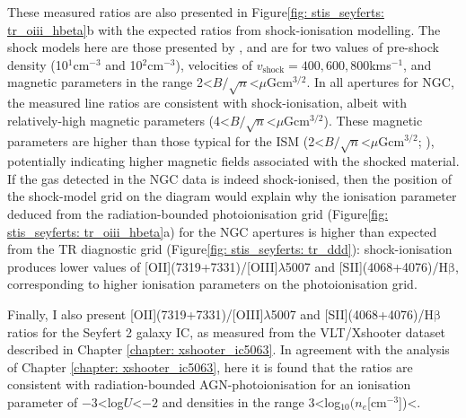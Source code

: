 These measured ratios are also presented in Figure\;\ref{fig: stis_seyferts: tr_oiii_hbeta}b with the expected ratios from shock-ionisation modelling. The shock models here are those presented by \citet{Allen2008}, and are for two values of pre-shock density (10$^1$\;cm$^{-3}$ and 10$^2$\;cm$^{-3}$), velocities of $v_\mathrm{shock}=400, 600, 800$\;km\;s$^{-1}$, and magnetic parameters in the range 2\;\textless\;$B/\sqrt{n}$\;\textless{}\;$\mu$G\;cm$^{3/2}$. In all apertures for NGC, the measured line ratios are consistent with shock-ionisation, albeit with relatively-high magnetic parameters (4\;\textless\;$B/\sqrt{n}$\;\textless{}\;$\mu$G\;cm$^{3/2}$). These magnetic parameters are higher than those typical for the ISM (2\;\textless\;$B/\sqrt{n}$\;\textless{}\;$\mu$G\;cm$^{3/2}$; \citealt{Dopita1995, Allen2008}), potentially indicating higher magnetic fields associated with the shocked material. If the gas detected in the NGC data is indeed shock-ionised, then the position of the shock-model grid on the diagram would explain why the ionisation parameter deduced from the radiation-bounded photoionisation grid (Figure\;\ref{fig: stis_seyferts: tr_oiii_hbeta}a) for the NGC apertures is higher than expected from the TR diagnostic grid (Figure\;\ref{fig: stis_seyferts: tr_ddd}): shock-ionisation produces lower values of [OII](7319+7331)/[OIII]$\lambda$5007 and [SII](4068+4076)/H$\mathrm{\beta}$, corresponding to higher ionisation parameters on the photoionisation grid.

Finally, I also present [OII](7319+7331)/[OIII]$\lambda$5007 and [SII](4068+4076)/H$\mathrm{\beta}$ ratios for the Seyfert 2 galaxy IC, as measured from the VLT/Xshooter dataset described in Chapter \ref{chapter: xshooter_ic5063}. In agreement with the analysis of Chapter \ref{chapter: xshooter_ic5063}, here it is found that the ratios are consistent with radiation-bounded AGN-photoionisation for an ionisation parameter of $-3$\;\textless\;log\;$U$\;\textless\;$-2$ and densities in the range 3\;\textless\;log$_{10}(n_e$[cm$^{-3}$])\;\textless{}.

